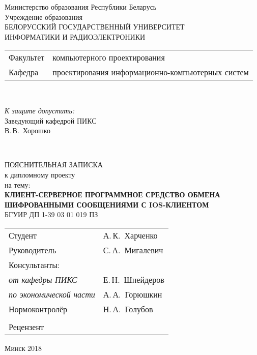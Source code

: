 \begin{titlepage}
  \begin{center}
    Министерство образования Республики Беларусь\\[1em]
    Учреждение образования\\
    БЕЛОРУССКИЙ ГОСУДАРСТВЕННЫЙ УНИВЕРСИТЕТ \\
    ИНФОРМАТИКИ И РАДИОЭЛЕКТРОНИКИ\\[1em]

    \begin{minipage}{\textwidth}
      \begin{flushleft}
        \begin{tabular}{ l l }
          Факультет & компьютерного проектирования\\
          Кафедра   & проектирования информационно-компьютерных систем
        \end{tabular}
      \end{flushleft}
    \end{minipage}\\[3em]

    \begin{flushright}
      \begin{minipage}{0.4\textwidth}
        \textit{К защите допустить:}\\[0.8em]
        Заведующий кафедрой ПИКС\\[0.45em]
        \underline{\hspace*{2.8cm}} В.\,В.~Хорошко
      \end{minipage}\\[2.2em]
    \end{flushright}

    {ПОЯСНИТЕЛЬНАЯ ЗАПИСКА}\\
    {к дипломному проекту}\\
    {на тему:}\\[1em]
    \textbf{\large\MakeUppercase{Клиент-серверное программное средство обмена шифрованными сообщениями с iOS-клиентом}}\\[1em]


    {БГУИР ДП 1-39 03 01 019 ПЗ}\\[2em]
    
    \begin{tabular}{ p{}p{} }
      Студент & А.\,К.~Харченко \\
      Руководитель & С.\,А.~Мигалевич \\
      Консультанты: &\\
      \hspace*{3ex}\emph{от кафедры ПИКС} & Е.\,Н.~Шнейдеров \\
      \hspace*{3ex}\emph{по экономической части} & А.\,А.~Горюшкин \\
      Нормоконтролёр & Н.\,А.~Голубов\\
      & \\
      Рецензент & \\
    \end{tabular}
    
    \vfill
    {\normalsize Минск 2018}
  \end{center}
\end{titlepage}


